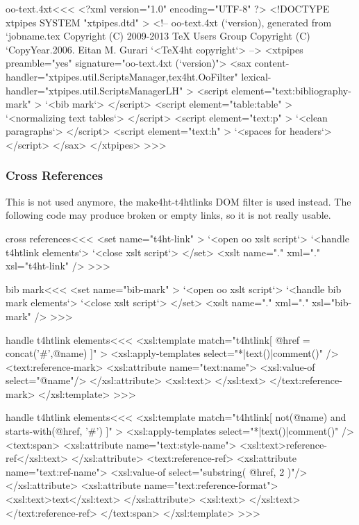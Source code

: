 \documentclass{article}
\begin{document}





\<oo-text.4xt\><<<
<?xml version="1.0" encoding="UTF-8" ?>
<!DOCTYPE xtpipes SYSTEM "xtpipes.dtd" >
<!-- oo-text.4xt (`version), generated from `jobname.tex
     Copyright (C) 2009-2013 TeX Users Group
     Copyright (C) `CopyYear.2006. Eitan M. Gurari
`<TeX4ht copyright`> -->
<xtpipes preamble="yes" signature="oo-text.4xt (`version)">
   <sax content-handler="xtpipes.util.ScriptsManager,tex4ht.OoFilter" 
        lexical-handler="xtpipes.util.ScriptsManagerLH" >
      <script element="text:bibliography-mark" >
         `<bib mark`>
      </script> 
      <script element="table:table" >
         `<normalizing text tables`>
      </script> 
      <script element="text:p" >
         `<clean paragraphs`>
      </script> 
      <script element="text:h" >
         `<spaces for headers`>
      </script> 
   </sax>
</xtpipes>
>>>


\subsubsection{Cross References}

This is not used anymore, the make4ht-t4htlinks DOM filter is used instead. The
following code may produce broken or empty links, so it is not really usable.

\<cross references\><<<
<set name="t4ht-link" >
   `<open oo xslt script`>
    `<handle t4htlink elements`>
   `<close xslt script`>
</set>
<xslt name="." xml="." xsl="t4ht-link" />
>>>

\<bib mark\><<<
<set name="bib-mark" >
   `<open oo xslt script`>
    `<handle bib mark elements`>
   `<close xslt script`>
</set>
<xslt name="." xml="." xsl="bib-mark" />
>>>



\<handle t4htlink elements\><<<
<xsl:template match="t4htlink[ @href = concat('#',@name) ]" >
  <xsl:apply-templates select="*|text()|comment()" />
  <text:reference-mark>
     <xsl:attribute name="text:name">
        <xsl:value-of select="@name"/>
     </xsl:attribute>
     <xsl:text> </xsl:text>
  </text:reference-mark>
</xsl:template> 
>>>

\<handle t4htlink elements\><<<
<xsl:template match="t4htlink[ not(@name) 
                           and
                               starts-with(@href, '#') 
]" >
  <xsl:apply-templates select="*|text()|comment()" />
   <text:span>
        <xsl:attribute name="text:style-name">
           <xsl:text>reference-ref</xsl:text>
        </xsl:attribute>
     <text:reference-ref>
        <xsl:attribute name="text:ref-name">
           <xsl:value-of select="substring( @href, 2 )"/>
        </xsl:attribute>
        <xsl:attribute name="text:reference-format">
           <xsl:text>text</xsl:text>
        </xsl:attribute>
        <xsl:text> </xsl:text>   
     </text:reference-ref>
   </text:span>
</xsl:template> 
>>>
\end{document}
